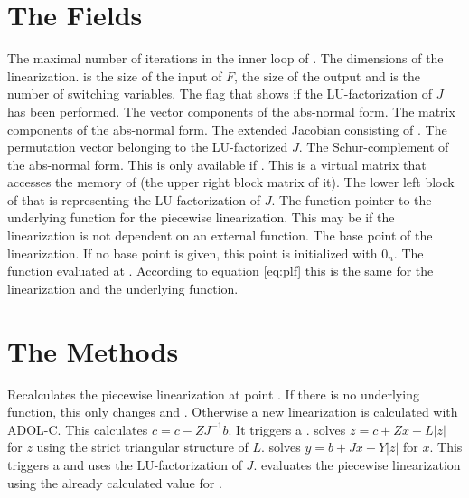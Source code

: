 \section[Private Fields]{The \texorpdfstring{}{Private} Fields}
\begin{description}
 The maximal number of iterations in the inner loop of .
 The dimensions of the linearization.  is the size of the input of $F$,  the size of the output and  is the number of switching variables.
 The flag that shows if the LU-factorization of $J$ has been performed.
 The vector components of the abs-normal form.
 The matrix components of the abs-normal form.
 The extended Jacobian consisting of . 
 The permutation vector belonging to the LU-factorized $J$. 
 The Schur-complement of the abs-normal form. This is only available if . This is a virtual matrix that accesses the memory of  (the upper right block matrix of it).
 The lower left block of  that is representing the LU-factorization of $J$. 
 The function pointer to the underlying function for the piecewise linearization. This may be  if the linearization is not dependent on an external function.
 The base point of the linearization. If no base point is given, this point is initialized with $0_n$.
 The function evaluated at . According to equation \eqref{eq:plf} this is the same for the linearization and the underlying function.
\end{description}
\section[Private Methods]{The \texorpdfstring{}{Private} Methods}
\begin{description}
 Recalculates the piecewise linearization at point . If there is no underlying function, this only changes  and . Otherwise a new linearization is calculated with ADOL-C.
 This calculates $\hat c = c - Z J^{-1}b$. It triggers a .
 solves $z = c + Zx + L|z|$ for $z$ using the strict triangular structure of $L$.
 solves $y = b + Jx + Y|z|$ for $x$. This triggers a  and uses the LU-factorization of $J$. 
 evaluates the piecewise linearization using the already calculated value for .
\end{description}